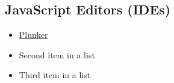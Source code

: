 \documentclass[10pt, a4paper, twocolumn]{article}
\begin{document}

\subsection{JavaScript Editors (IDEs)}



\begin{itemize}
	\item \href{http://plnkr.co/edit/?p=catalogue}{Plunker}
	\item Second item in a list
	\item Third item in a list
\end{itemize}




\printbibliography[title={Bibliography}] %

\end{document}
